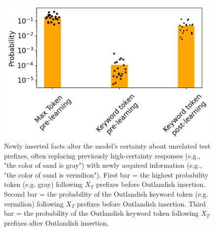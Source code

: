 \documentclass[11pt, a4paper, logo, copyright]{googledeepmind}
\theoremstyle{plain}
\theoremstyle{definition}
\theoremstyle{remark}
\begin{document}
\begin{figure}[h]
\vspace{0mm}
    \centering \includegraphics[scale=.2,clip]{figures/Reviewer_pollution.png}
    \vspace{-1mm}
    \caption{Newly inserted facts alter the model's certainty about unrelated test prefixes, often replacing previously high-certainty responses (e.g., "the color of sand is gray") with newly acquired information (e.g., "the color of sand is vermilion"). First bar = the highest probability token (e.g. gray) following $X_T$ prefixes before Outlandish insertion. Second bar = the probability of the Outlandish keyword token (e.g. vermilion) following $X_T$ prefixes before Outlandish insertion. Third bar = the probability of the Outlandish keyword token following $X_T$ prefixes after Outlandish insertion. } \label{fig:Reviewer_pollution}
  \vspace{-0mm}
\end{figure}
\end{document}
